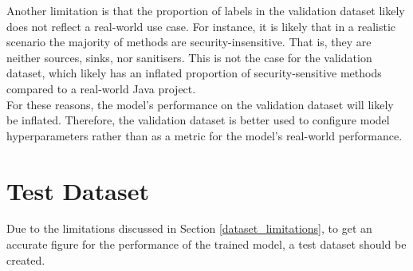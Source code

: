 \noindent
Another limitation is that the proportion of labels in the validation dataset likely does not reflect a real-world use case. For instance, it is likely that in a realistic scenario the majority of methods are security-insensitive. That is, they are neither sources, sinks, nor sanitisers. This is not the case for the validation dataset, which likely has an inflated proportion of security-sensitive methods compared to a real-world Java project.\\

\noindent
For these reasons, the model's performance on the validation dataset will likely be inflated. Therefore, the validation dataset is better used to configure model hyperparameters rather than as a metric for the model's real-world performance.




\section{Test Dataset}
\label{test-dataset}
Due to the limitations discussed in Section \ref{dataset_limitations}, to get an accurate figure for the performance of the trained model, a test dataset should be created. \\

